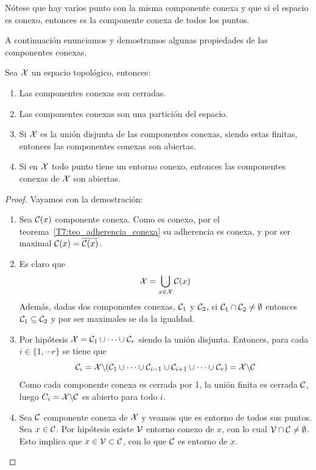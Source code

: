 \begin{obs}
	Nótese que hay varios punto con la misma componente conexa y que si el espacio es conexo, entonces es la componente conexa de todos los puntos.
\end{obs}

A continuación enunciamos y demostramos algunas propiedades de las componentes conexas.

\begin{lem}
	Sea $\mathcal{X}$ un espacio topológico, entonces:
	\begin{enumerate}
		\item Las componentes conexas son cerradas.
		
		\item Las componentes conexas son una partición del espacio.
		
		\item Si $\mathcal{X}$ es la unión disjunta de las componentes conexas, siendo estas finitas, entonces las componentes conexas son abiertas.
		
		\item Si en $\mathcal{X}$ todo punto tiene un entorno conexo, entonces las componentes conexas de $\mathcal{X}$ son abiertas.
	\end{enumerate}
\end{lem}
\begin{proof}
	Vayamos con la demostración:
	\begin{enumerate}
		\item Sea $\mathcal{C}(x)$ componente conexa. Como es conexo, por el teorema~\ref{T7:teo_adherencia_conexa} su adherencia es conexa, y por ser maximal $\mathcal{C}(x)=\overline{\mathcal{C}(x)}$.
		
		\item Es claro que
		\[\mathcal{X}=\bigcup_{x\in\mathcal{X}} \mathcal{C}(x)\]
		Además, dadas dos componentes conexas, $\mathcal{C}_1$ y $\mathcal{C}_2$, si $\mathcal{C}_1\cap\mathcal{C}_2\not=\emptyset$ entonces $\mathcal{C}_1\subseteq\mathcal{C}_2$ y por ser maximales se da la igualdad.
		
		\item Por hipótesis $\mathcal{X}=\mathcal{C}_1\cup\cdots\cup\mathcal{C}_r$ siendo la unión disjunta. Entonces, para cada $i\in\{1,\cdots r\}$ se tiene que 
		\[\mathcal{C}_i=\mathcal{X}\backslash (\mathcal{C}_1\cup\cdots\cup\mathcal{C}_{i-1}\cup\mathcal{C}_{i+1}\cup\cdots\cup\mathcal{C}_r)=\mathcal{X}\backslash \mathcal{C}\]
		Como cada componente conexa es cerrada por 1, la unión finita es cerrada $\mathcal{C}$, luego $C_i=\mathcal{X}\backslash \mathcal{C}$ es abierto para todo $i$.
		
		\item Sea $\mathcal{C}$ componente conexa de $\mathcal{X}$ y veamos que es entorno de todos sus puntos. Sea $x\in\mathcal{C}$. Por hipótesis existe $\mathcal{V}$ entorno conexo de $x$, con lo cual $\mathcal{V}\cap\mathcal{C}\not=\emptyset$. Esto implica que $x\in\mathcal{V}\subset\mathcal{C}$, con lo que $\mathcal{C}$ es entorno de $x$.
	\end{enumerate}
\end{proof}

